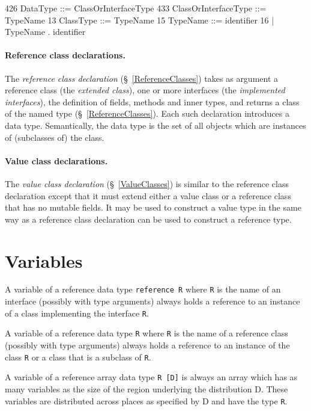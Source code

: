 \begin{x10}
426   DataType ::= ClassOrInterfaceType
433   ClassOrInterfaceType ::= TypeName 
13    ClassType ::= TypeName
15    TypeName ::= identifier
16     | TypeName . identifier
\end{x10}

\paragraph{Reference class declarations.}\label{ReferenceTypes}
The {\em reference class declaration} (\S~\ref{ReferenceClasses}) takes
as argument a reference class (the {\em extended class}), one or more
interfaces (the {\em implemented interfaces}), the definition of
fields, methods and inner types, and returns a class of the named type
(\S~\ref{ReferenceClasses}). Each such declaration introduces a data
type. Semantically, the data type is the set of all objects which are
instances of (subclasses of) the class.

\paragraph{Value class declarations.}
The {\em value class declaration} (\S~\ref{ValueClasses}) is
similar to the reference class declaration except that it must extend
either a value class or a reference class that has no mutable fields.
It may be used to construct a value type in the same way as a
reference class declaration can be used to construct a reference type.




\notfouro{}

\section{Variables}\label{XtenVariables}

A variable of a reference data type {\tt reference R} where {\tt R} is
the name of an interface (possibly with type arguments) always holds a
reference to an instance of a class implementing the interface {\tt R}.

A variable of a reference data type {\tt R} where {\tt R} is the name
of a reference class (possibly with type arguments) always holds a
reference to an instance of the class {\tt R} or a class that is a
subclass of {\tt R}. 

A variable of a reference array data type {\tt R [D]} is always an
array which has as many variables as the size of the region underlying
the distribution {\cf D}. These variables are distributed across
places as specified by {\cf D} and have the type {\tt R}.

